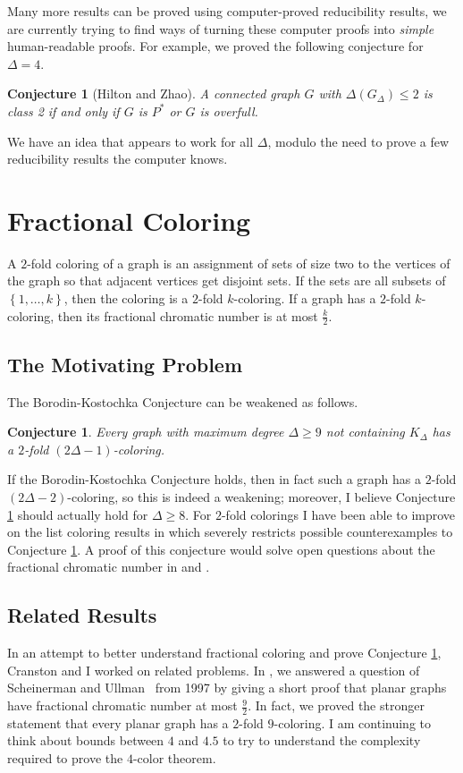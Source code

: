 \documentclass[12pt]{article}
\theoremstyle{plain}
\newtheorem{conjecture}[thm]{Conjecture}
\theoremstyle{definition}
\theoremstyle{remark}
\newcommand{\set}[1]{\left\{ #1 \right\}}
\begin{document}
Many more results can be proved using computer-proved reducibility results, we are currently trying to find ways of turning these computer proofs into \emph{simple} human-readable proofs.  For example, we proved the following conjecture for $\Delta=4$.

\begin{conjecture}[Hilton and Zhao]
	A connected graph $G$ with $\Delta(G_\Delta) \le 2$ is class 2 if and only if $G$ is $P^*$ or $G$ is overfull.
\end{conjecture}

We have an idea that appears to work for all $\Delta$, modulo the need to prove a few reducibility results the computer knows.

\section{Fractional Coloring}
A $2$-fold coloring of a graph is an assignment of sets of size two to the vertices of the graph so that adjacent vertices get disjoint sets.  If the sets are all subsets of $\set{1, \ldots, k}$, then the coloring is a $2$-fold $k$-coloring.  If a graph has a $2$-fold $k$-coloring, then its fractional chromatic number is at most $\frac{k}{2}$.

\subsection{The Motivating Problem}
The Borodin-Kostochka Conjecture can be weakened as follows.

\begin{conjecture}\label{twofold}
	Every graph with maximum degree $\Delta \geq 9$ not containing $K_\Delta$ has a $2$-fold $(2\Delta-1)$-coloring.
\end{conjecture}

If the Borodin-Kostochka Conjecture holds, then in fact such a graph has a $2$-fold $(2\Delta-2)$-coloring, so this is indeed a weakening; moreover, I believe Conjecture \ref{twofold} should actually hold for $\Delta \geq 8$.  For $2$-fold colorings I have been able to improve on the list coloring results in \cite{cranstonrabernapriori} which severely restricts possible counterexamples to Conjecture \ref{twofold}.  A proof of this conjecture would solve open questions about the fractional chromatic number in \cite{king2012fractional} and \cite{edwards2012bounding}.

\subsection{Related Results}
In an attempt to better understand fractional coloring and prove Conjecture \ref{twofold}, Cranston and I worked on related problems.  In \cite{cranston2014planar}, we answered a question of Scheinerman and Ullman~\cite[p.~75]{SU-book} from 1997 by giving a short proof that planar graphs have fractional chromatic number at most $\frac92$.  In fact, we proved the stronger statement that every planar graph has a $2$-fold $9$-coloring.  I am continuing to think about bounds between $4$ and $4.5$ to try to understand the complexity required to prove the $4$-color theorem.
\end{document}
